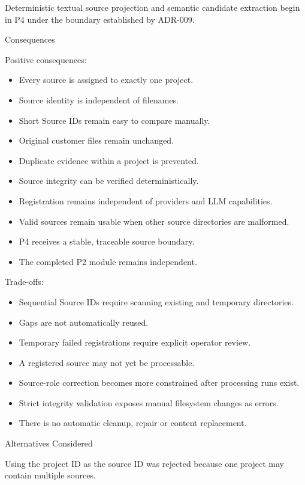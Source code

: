 Deterministic textual source projection and semantic candidate extraction begin in P4 under the boundary established by ADR-009.

Consequences

Positive consequences:

\begin{itemize}
\tightlist
\item
  Every source is assigned to exactly one project.
\item
  Source identity is independent of filenames.
\item
  Short Source IDs remain easy to compare manually.
\item
  Original customer files remain unchanged.
\item
  Duplicate evidence within a project is prevented.
\item
  Source integrity can be verified deterministically.
\item
  Registration remains independent of providers and LLM capabilities.
\item
  Valid sources remain usable when other source directories are malformed.
\item
  P4 receives a stable, traceable source boundary.
\item
  The completed P2 module remains independent.
\end{itemize}

Trade-offs:

\begin{itemize}
\tightlist
\item
  Sequential Source IDs require scanning existing and temporary directories.
\item
  Gaps are not automatically reused.
\item
  Temporary failed registrations require explicit operator review.
\item
  A registered source may not yet be processable.
\item
  Source-role correction becomes more constrained after processing runs exist.
\item
  Strict integrity validation exposes manual filesystem changes as errors.
\item
  There is no automatic cleanup, repair or content replacement.
\end{itemize}

Alternatives Considered

Using the project ID as the source ID was rejected because one project may contain multiple sources.

